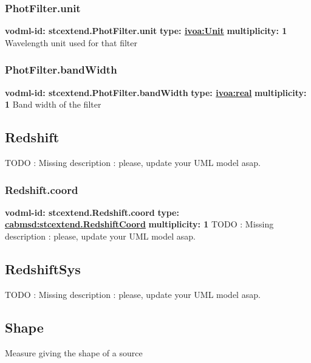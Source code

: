     \subsubsection{PhotFilter.unit}
      \textbf{vodml-id: stcextend.PhotFilter.unit} \newline
      \textbf{type: \hyperref[sect:ivoa]{ivoa:Unit}} \newline
      \textbf{multiplicity: 1} \newline 
      Wavelength unit used for that filter

    \subsubsection{PhotFilter.bandWidth}
      \textbf{vodml-id: stcextend.PhotFilter.bandWidth} \newline
      \textbf{type: \hyperref[sect:ivoa]{ivoa:real}} \newline
      \textbf{multiplicity: 1} \newline 
      Band width of the filter

  \subsection{Redshift}
  \label{sect:stcextend.Redshift}
    TODO : Missing description : please, update your UML model asap.

    \subsubsection{Redshift.coord}
      \textbf{vodml-id: stcextend.Redshift.coord} \newline
      \textbf{type: \hyperref[sect:stcextend.RedshiftCoord]{cabmsd:stcextend.RedshiftCoord}} \newline
      \textbf{multiplicity: 1} \newline 
      TODO : Missing description : please, update your UML model asap.

  \subsection{RedshiftSys}
  \label{sect:stcextend.RedshiftSys}
    TODO : Missing description : please, update your UML model asap.

  \subsection{Shape}
  \label{sect:stcextend.Shape}
    Measure giving the shape of a source

